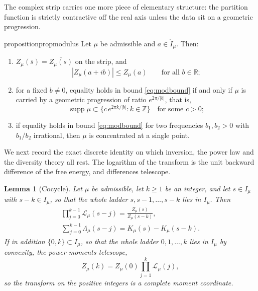 \documentclass[sn-mathphys-num]{sn-jnl}
\theoremstyle{thmstyleone}%
\newtheorem{lemma}{Lemma}%
\theoremstyle{thmstyletwo}%
\theoremstyle{thmstylethree}%
\theoremstyle{thmstyleone}%
\providecommand{\R}{\mathbb{R}}
\providecommand{\Z}{\mathbb{Z}}
\providecommand{\Leh}{\mathscr{L}}
\providecommand{\supp}{\operatorname{supp}}
\begin{document}
	
	The complex strip carries one more piece of elementary structure:
	the partition function is strictly contractive off the real axis
	unless the data sit on a geometric progression.
	
	\begin{restatable}{proposition}{propmodulus}\label{prop:modulus}
		Let $\mu$ be admissible and $a\in\mathring I_\mu$. Then:
		\begin{enumerate}[label=\textup{(\roman*)},leftmargin=2.2em]
			\item $Z_\mu(\bar s)=\overline{Z_\mu(s)}$ on the strip, and
			\begin{equation}\label{eq:modbound}
				|Z_\mu(a+ib)|\le Z_\mu(a)\qquad\text{for all }b\in\R;
			\end{equation}
			\item for a fixed $b\neq0$, equality holds in
			bound \eqref{eq:modbound} if and only if $\mu$ is carried by a
			geometric progression of ratio $e^{2\pi/|b|}$, that is,
			\begin{equation}\label{eq:lattice}
				\supp\mu\subset\bigl\{c\,e^{2\pi k/|b|}:k\in\Z\bigr\}
				\quad\text{for some }c>0 ;
			\end{equation}
			\item if equality holds in bound \eqref{eq:modbound} for two
			frequencies $b_1,b_2>0$ with $b_1/b_2$ irrational, then $\mu$
			is concentrated at a single point.
		\end{enumerate}
	\end{restatable}
	
	We next record the exact discrete identity
	on which inversion, the power law and the diversity theory all rest.
	The logarithm of the transform is the unit backward difference of the
	free energy, and differences telescope.
	
	\begin{lemma}[Cocycle]\label{lem:cocycle}
		Let $\mu$ be admissible, let $k\ge1$ be an integer, and let
		$s\in I_\mu$ with $s-k\in I_\mu$, so that the whole ladder
		$s,s-1,\dots,s-k$ lies in $I_\mu$. Then
		\begin{equation}\label{eq:cocycle}
			\begin{gathered}
				\prod_{j=0}^{k-1}\Leh_\mu(s-j)=\frac{Z_\mu(s)}{Z_\mu(s-k)},\\
				\sum_{j=0}^{k-1}\Lambda_\mu(s-j)=K_\mu(s)-K_\mu(s-k).
			\end{gathered}
		\end{equation}
		If in addition $\{0,k\}\subset I_\mu$, so that the whole ladder
		$0,1,\dots,k$ lies in $I_\mu$ by convexity, the power moments
		telescope,
		\begin{equation}\label{eq:momenttelescope}
			Z_\mu(k)=Z_\mu(0)\prod_{j=1}^{k}\Leh_\mu(j),
		\end{equation}
		so the transform on the positive integers is a complete moment
		coordinate.
	\end{lemma}
	
\end{document}
